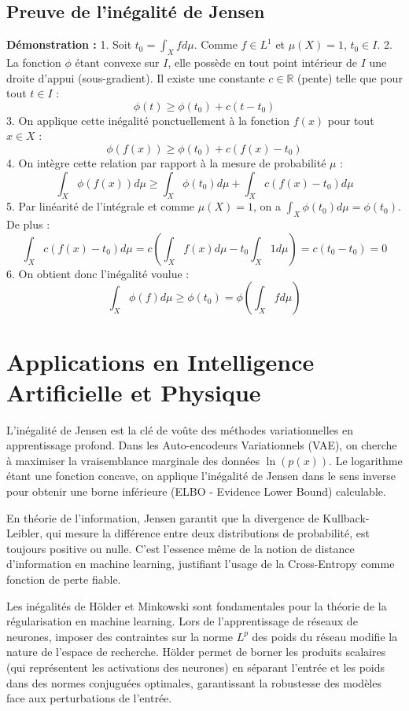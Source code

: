 \documentclass[11pt,a4paper]{article}
\begin{document}
\subsection*{Preuve de l'inégalité de Jensen}

\textbf{Démonstration :}
1. Soit $t_0 = \int_X f d\mu$. Comme $f \in L^1$ et $\mu(X)=1$, $t_0 \in I$.
2. La fonction $\phi$ étant convexe sur $I$, elle possède en tout point intérieur de $I$ une droite d'appui (sous-gradient). Il existe une constante $c \in \mathbb{R}$ (pente) telle que pour tout $t \in I$ :
   $$\phi(t) \ge \phi(t_0) + c(t - t_0)$$
3. On applique cette inégalité ponctuellement à la fonction $f(x)$ pour tout $x \in X$ :
   $$\phi(f(x)) \ge \phi(t_0) + c(f(x) - t_0)$$
4. On intègre cette relation par rapport à la mesure de probabilité $\mu$ :
   $$\int_X \phi(f(x)) d\mu \ge \int_X \phi(t_0) d\mu + \int_X c(f(x) - t_0) d\mu$$
5. Par linéarité de l'intégrale et comme $\mu(X)=1$, on a $\int_X \phi(t_0) d\mu = \phi(t_0)$. De plus :
   $$\int_X c(f(x) - t_0) d\mu = c \left( \int_X f(x) d\mu - t_0 \int_X 1 d\mu \right) = c (t_0 - t_0) = 0$$
6. On obtient donc l'inégalité voulue :
   $$\int_X \phi(f) d\mu \ge \phi(t_0) = \phi \left( \int_X f d\mu \right)$$

\section*{Applications en Intelligence Artificielle et Physique}

L'inégalité de Jensen est la clé de voûte des méthodes variationnelles en apprentissage profond. Dans les Auto-encodeurs Variationnels (VAE), on cherche à maximiser la vraisemblance marginale des données $\ln(p(x))$. Le logarithme étant une fonction concave, on applique l'inégalité de Jensen dans le sens inverse pour obtenir une borne inférieure (ELBO - Evidence Lower Bound) calculable.

En théorie de l'information, Jensen garantit que la divergence de Kullback-Leibler, qui mesure la différence entre deux distributions de probabilité, est toujours positive ou nulle. C'est l'essence même de la notion de distance d'information en machine learning, justifiant l'usage de la Cross-Entropy comme fonction de perte fiable.

Les inégalités de Hölder et Minkowski sont fondamentales pour la théorie de la régularisation en machine learning. Lors de l'apprentissage de réseaux de neurones, imposer des contraintes sur la norme $L^p$ des poids du réseau modifie la nature de l'espace de recherche. Hölder permet de borner les produits scalaires (qui représentent les activations des neurones) en séparant l'entrée et les poids dans des normes conjuguées optimales, garantissant la robustesse des modèles face aux perturbations de l'entrée.
\end{document}
